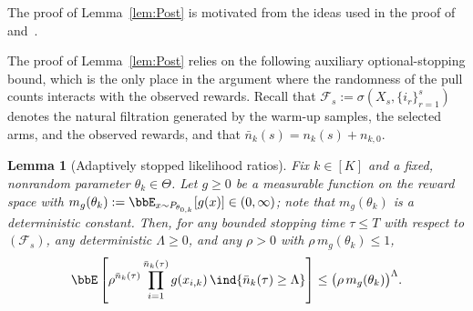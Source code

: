 \documentclass[11pt]{article}
\newtheorem{lemma}[theorem]{Lemma}
\begin{document}
The proof of Lemma~\ref{lem:Post} is motivated from the ideas used in the proof of~\cite[Theorem 3.1]{bhattacharya2019bayesian} and~\cite[Theorem 2.1]{ZG}. 

The proof of Lemma~\ref{lem:Post} relies on the following auxiliary optional-stopping bound, which is the only place in the argument where the randomness of the pull counts interacts with the observed rewards. Recall that $\mathcal{F}_s := \sigma\left(X_s, \{i_r\}_{r=1}^s\right)$ denotes the natural filtration generated by the warm-up samples, the selected arms, and the observed rewards, and that $\bar n_k(s) = n_k(s) + n_{k,0}$.

\begin{lemma}[Adaptively stopped likelihood ratios]\label{lem:MG}
Fix $k \in [K]$ and a \emph{fixed, nonrandom} parameter $\theta_k \in \Theta$. Let $g \geq 0$ be a measurable function on the reward space with $m_g(\theta_k) := \bbE_{x \sim P_{\theta_{0,k}}}[g(x)] \in (0,\infty)$; note that $m_g(\theta_k)$ is a deterministic constant. Then, for any bounded stopping time $\tau \leq T$ with respect to $(\mathcal{F}_s)$, any deterministic $\Lambda \geq 0$, and any $\rho > 0$ with $\rho\, m_g(\theta_k) \leq 1$,
\begin{align}
    \bbE\left[ \rho^{\bar n_k(\tau)} \prod_{i=1}^{\bar n_k(\tau)} g(x_{i,k})\, \ind\{\bar n_k(\tau) \geq \Lambda\} \right] \leq \big(\rho\, m_g(\theta_k)\big)^{\Lambda}.
    \label{eq:MGkey}
\end{align}

\end{lemma}
\end{document}
